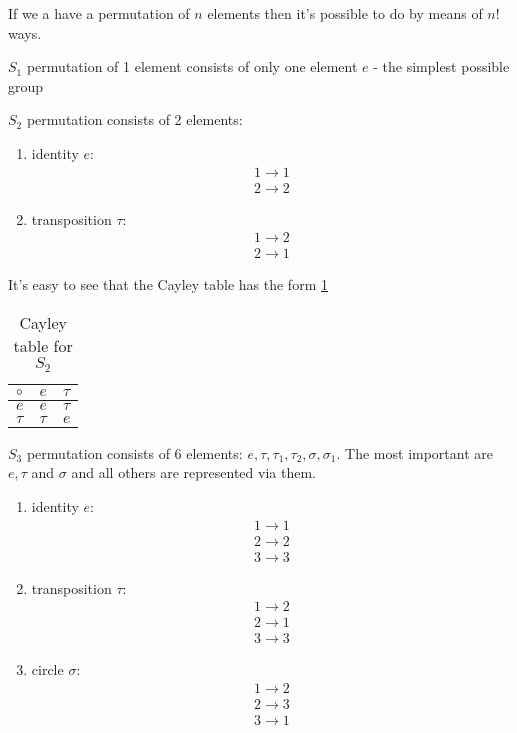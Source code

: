 \begin{example}[$S_n$ group]
  If we a have a permutation of $n$ elements then it's possible to do
  by means of $n!$ ways.
  
  $S_1$ permutation of 1 element consists of only one element $e$ -
  the simplest possible group

  $S_2$ permutation consists of 2 elements:
  \begin{enumerate}
  \item identity $e$:
    \[
    \begin{array}{c}
    1 \to 1 \\
    2 \to 2
    \end{array}
    \]
  \item transposition $\tau$:
    \[
    \begin{array}{c}
    1 \to 2 \\
    2 \to 1
    \end{array}
    \]    
  \end{enumerate}
  It's easy to see that the Cayley table has the form \ref{tab:CayleyS2}
    \begin{table}
    \centering
    \caption{Cayley table for $S_2$}
    \label{tab:CayleyS2}
    \begin{tabular}{l|ll}
      \toprule
      $\circ$ & $e$ & $\tau$ \\
      \midrule
      $e$ & $e$ & $\tau$ \\
      $\tau$ & $\tau$ & $e$ \\
      \bottomrule
    \end{tabular}
    \end{table}

    $S_3$ permutation consists of 6 elements: $e, \tau, \tau_1, \tau_2,
    \sigma, \sigma_1$. The most important are $e, \tau$ and $\sigma$
    and all others are represented via them.
  \begin{enumerate}
  \item identity $e$:
    \[
    \begin{array}{c}
    1 \to 1 \\
    2 \to 2 \\
    3 \to 3
    \end{array}
    \]
  \item transposition $\tau$:
    \[
    \begin{array}{c}
    1 \to 2 \\
    2 \to 1 \\
    3 \to 3
    \end{array}
    \]    
  \item circle $\sigma$:
    \[
    \begin{array}{c}
    1 \to 2 \\
    2 \to 3 \\
    3 \to 1
    \end{array}
    \]    
  \end{enumerate}  
  \label{ex:sngroup}
\end{example}


